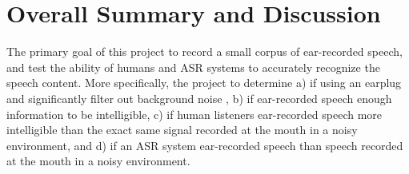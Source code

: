 % 
% 
% 

\chapter{Overall Summary and Discussion\label{chapter5}}


The primary goal of this project \DIFdelbegin {}\DIFdelend \DIFaddbegin {}\DIFaddend to record a small corpus of ear-recorded speech, and test the ability of humans and ASR systems to accurately recognize the speech content.  More specifically, the project \DIFdelbegin {}\DIFdelend \DIFaddbegin {}\DIFaddend to determine a) if \DIFdelbegin {}\DIFdelend using an earplug and \DIFdelbegin {}\DIFdelend \DIFaddbegin {}\DIFaddend significantly filter out background noise \DIFaddbegin {}\DIFaddend , b) if ear-recorded speech \DIFdelbegin {}\DIFdelend \DIFaddbegin {}\DIFaddend enough information to be intelligible, c) if human listeners \DIFdelbegin {}\DIFdelend \DIFaddbegin {}\DIFaddend ear-recorded speech more intelligible than the exact same signal recorded at the mouth in a noisy environment, and d) if an ASR system \DIFdelbegin {}\DIFdelend \DIFaddbegin {}\DIFaddend ear-recorded speech \DIFdelbegin {}\DIFdelend than speech recorded at the mouth in a noisy environment. \DIFdelbegin %


